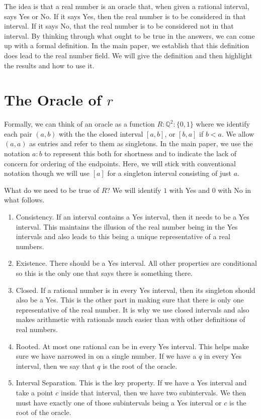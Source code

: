 \documentclass[12pt]{article}
\theoremstyle{remark}
\begin{document}
The idea is that a real number is an oracle that, when given a rational interval, says Yes or No. If it says Yes, then the real number is to be considered in that interval. If it says No, that the real number is to be considered not in that interval. By thinking through what ought to be true in the answers, we can come up with a formal definition. In the main paper, we establish that this definition does lead to the real number field. We will give the definition and then highlight the results and how to use it. 

\section{The Oracle of $r$}\label{sec:ora}

Formally, we can think of an oracle as a function $R: \mathbb{Q}^2 : \{0,1\}$ where we identify each pair $(a,b)$ with the  the closed interval $[a,b]$, or $[b,a]$ if $b < a$. We allow $(a,a)$ as entries and refer to them as singletons. In the main paper, we use the notation $a:b$ to represent this both for shortness and to indicate the lack of concern for ordering of the endpoints. Here, we will stick with conventional notation though we will use $[a]$ for a singleton interval consisting of just $a$. 

What do we need to be true of $R$? We will identify $1$ with Yes and $0$ with No in what follows. 

\begin{enumerate}
    \item Consistency. If an interval contains a Yes interval, then it needs to be a Yes interval. This maintains the illusion of the real number being in the Yes intervals and also leads to this being a unique representative of a real numbers. 
    \item Existence. There should be a Yes interval. All other properties are conditional so this is the only one that says there is something there. 
    \item Closed. If a rational number is in every Yes interval, then its singleton should also be a Yes. This is the other part in making sure that there is only one representative of the real number. It is why we use closed intervals and also makes arithmetic with rationals much easier than with other definitions of real numbers.
    \item Rooted. At most one rational can be in every Yes interval. This helps make sure we have narrowed in on a single number. If we have a $q$ in every Yes interval, then we say that $q$ is the root of the oracle. 
    \item Interval Separation. This is the key property. If we have a Yes interval and take a point $c$ inside that interval, then we have two subintervals. We then must have exactly one of those subintervals being a Yes interval or $c$ is the root of the oracle. 
\end{enumerate}
\end{document}

